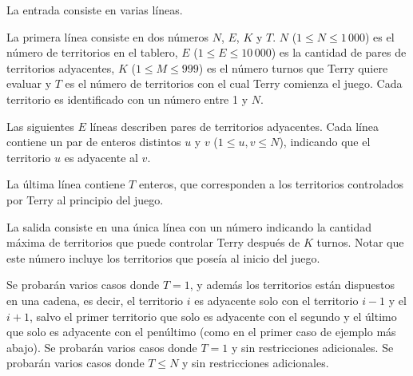 \documentclass{oci}
\begin{document}
\begin{inputDescription}
  La entrada consiste en varias líneas.

  La primera línea consiste en dos números $N$, $E$, $K$ y $T$.
  $N$ ($1 \le N \le 1\,000$) es el número de territorios en el tablero,
  $E$ ($1 \le E \le 10\,000$) es la cantidad de pares de territorios
  adyacentes,
  $K$ ($1 \le M \le 999$) es el número turnos que Terry quiere evaluar y
  $T$ es el número de territorios con el cual Terry comienza
  el juego.
  Cada territorio es identificado con un número entre 1 y $N$.

  Las siguientes $E$ líneas describen pares de territorios adyacentes.
  Cada línea contiene un par de enteros distintos $u$ y $v$ ($1\leq u,v\leq N$),
  indicando que el territorio $u$ es adyacente al $v$.

  La última línea contiene $T$ enteros, que corresponden a los territorios
  controlados por Terry al principio del juego.

\end{inputDescription}

\begin{outputDescription}
  La salida consiste en una única línea con un número indicando la cantidad
  máxima de territorios que puede controlar Terry después de $K$ turnos.
  Notar que este número incluye los territorios que poseía al inicio del juego.
\end{outputDescription}

\begin{scoreDescription}
   Se probarán varios casos donde $T=1$, y además los
  territorios están dispuestos en una cadena, es decir, el territorio $i$
  es adyacente solo con el territorio $i-1$ y el $i+1$, salvo el primer
  territorio que solo es adyacente con el segundo y el último que solo es
  adyacente con el penúltimo (como en el primer caso de ejemplo más abajo).
   Se probarán varios casos donde $T=1$ y sin
  restricciones adicionales.
   Se probarán varios casos donde $T\leq N$ y sin restricciones
  adicionales.
\end{scoreDescription}

\begin{sampleDescription}
\end{sampleDescription}
\end{document}
